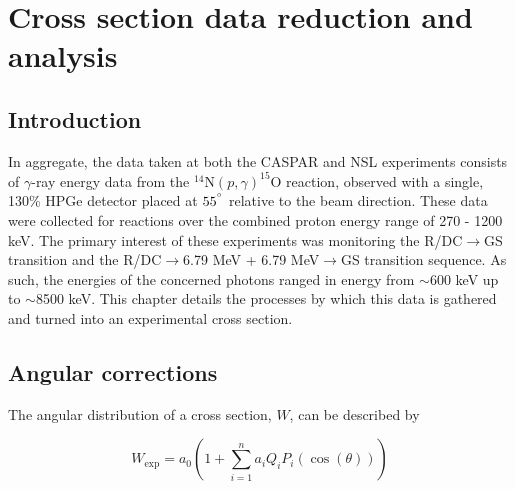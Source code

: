 %
%
%
%
%
%
%
%
%
%

%
%

\chapter{Cross section data reduction and analysis}
\label{chap: data}

\section{Introduction}

In aggregate, the data taken at both the CASPAR and NSL experiments consists of $\gamma$-ray energy data from the $^{14}$N$\left( p,\gamma \right) ^{15}$O reaction, observed with a single, 130\% HPGe detector placed at $55^{\degree}$ relative to the beam direction. These data were collected for reactions over the combined proton energy range of 270 - 1200 keV. The primary interest of these experiments was monitoring the R/DC$\rightarrow$GS transition and the R/DC$\rightarrow$6.79 MeV + 6.79 MeV$\rightarrow$GS transition sequence. As such, the energies of the concerned photons ranged in energy from $\sim$600 keV up to $\sim$8500 keV. This chapter details the processes by which this data is gathered and turned into an experimental cross section.

\section{Angular corrections}
\label{sec: angularCorrections}

The angular distribution of a cross section, $W$, can be described by

\begin{equation}
W_{\text{exp}} = a_{0} \left(1 + \sum_{i = 1}^{n} a_{i} Q_{i} P_{i} ( \cos (\theta) )    \right)
\end{equation}

